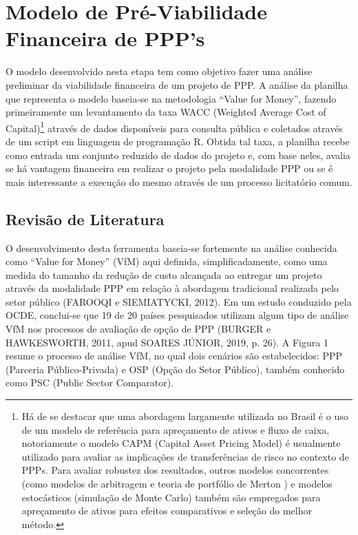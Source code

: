 \section{Modelo de Pré-Viabilidade Financeira de PPP's}
\label{sec:modelo-de-pre-viabilidade-financeira-de-ppps}

O modelo desenvolvido nesta etapa tem como objetivo fazer uma análise preliminar da viabilidade financeira de um projeto de PPP. A análise da planilha que representa o modelo baseia-se na metodologia “Value for Money”, fazendo primeiramente um levantamento da taxa WACC (Weighted Average Cost of Capital)\footnote{Há de se destacar que uma abordagem largamente utilizada no Brasil é o uso de um modelo de referência para apreçamento de ativos e fluxo de caixa, notoriamente o modelo CAPM (Capital Asset Pricing Model) é usualmente utilizado para avaliar as implicações de transferências de risco no contexto de PPPs. Para avaliar robustez dos resultados, outros modelos concorrentes (como modelos de arbitragem e teoria de portfólio de Merton ) e modelos estocásticos (simulação de Monte Carlo) também são empregados para apreçamento de ativos para efeitos comparativos e seleção do melhor método.}  através de dados disponíveis para consulta pública e coletados através de um script em linguagem de programação R. Obtida tal taxa, a planilha recebe como entrada um conjunto reduzido de dados do projeto e, com base neles, avalia se há vantagem financeira em realizar o projeto pela modalidade PPP ou se é mais interessante a execução do mesmo através de um processo licitatório comum.

\subsection{Revisão de Literatura}
\label{subsec:revisao-da-literatura}

O desenvolvimento desta ferramenta baseia-se fortemente na análise conhecida como “Value for Money” (VfM) aqui definida, simplificadamente, como uma medida do tamanho da redução de custo alcançada ao entregar um projeto através da modalidade PPP em relação à abordagem tradicional realizada pelo setor público (FAROOQI e SIEMIATYCKI, 2012). Em um estudo conduzido pela OCDE, conclui-se que 19 de 20 países pesquisados utilizam algum tipo de análise VfM nos processos de avaliação de opção de PPP (BURGER e HAWKESWORTH, 2011, apud SOARES JÚNIOR, 2019, p. 26). A Figura 1 resume o processo de análise VfM, no qual dois cenários são estabelecidos: PPP (Parceria Público-Privada) e OSP (Opção do Setor Público), também conhecido como PSC (Public Sector Comparator).

